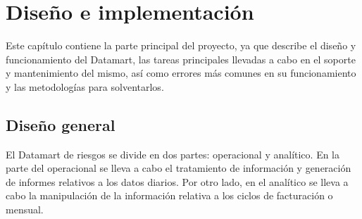 \documentclass[a4paper, 12pt]{book}
\begin{document}

\cleardoublepage
\chapter{Diseño e implementación}

Este capítulo contiene la parte principal del proyecto, ya que describe el diseño y funcionamiento del Datamart, las tareas principales llevadas a cabo en el soporte y mantenimiento del mismo, así como errores más comunes en su funcionamiento y las metodologías para solventarlos.

\section{Diseño general} 
\label{sec:diseno}
El Datamart de riesgos se divide en dos partes: operacional y analítico. En la parte del operacional se lleva a cabo el tratamiento de información y generación de informes relativos a los datos diarios. Por otro lado, en el analítico se lleva a cabo la manipulación de la información relativa a los ciclos de facturación o mensual.
\end{document}

